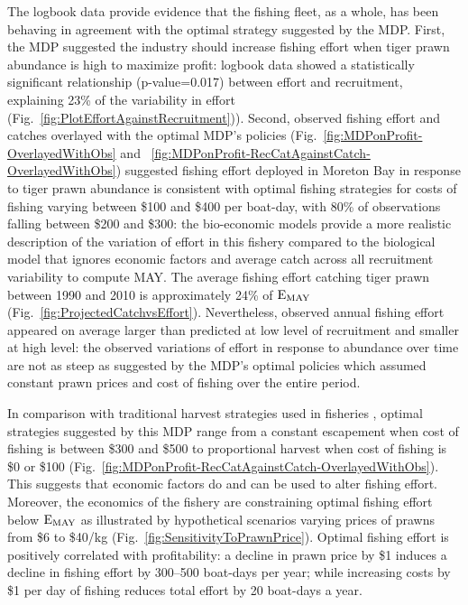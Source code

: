 The logbook data provide evidence that the fishing fleet, as a whole, has been behaving in agreement with the optimal strategy suggested by the MDP. First, the MDP suggested the industry should increase fishing effort when tiger prawn abundance is high to maximize profit: logbook data showed a statistically significant relationship (p-value=0.017) between effort and recruitment, explaining 23\% of the variability in effort (Fig.~\ref{fig:PlotEffortAgainstRecruitment})). Second, observed fishing effort and catches overlayed with the optimal MDP's policies (Fig.~\ref{fig:MDPonProfit-OverlayedWithObs} and ~\ref{fig:MDPonProfit-RecCatAgainstCatch-OverlayedWithObs}) suggested fishing effort deployed in Moreton Bay in response to tiger prawn abundance is consistent with optimal fishing strategies for costs of fishing varying between \$100 and \$400 per boat-day, with 80\% of observations falling between \$200 and \$300: the bio-economic models provide a more realistic description of the variation of effort in this fishery compared to the biological model that ignores economic factors and average catch across all recruitment variability to compute MAY. The average fishing effort catching tiger prawn between 1990 and 2010 is approximately 24\% of ${\rm E_{MAY}}$ (Fig.~\ref{fig:ProjectedCatchvsEffort}). Nevertheless, observed annual fishing effort appeared on average larger than predicted at low level of recruitment and smaller at high level: the observed variations of effort in response to abundance over time are not as steep as suggested by the MDP's optimal policies which assumed constant prawn prices and cost of fishing over the entire period. 

In comparison with traditional harvest strategies used in fisheries \citep{hil92b}, optimal strategies suggested by this MDP range from a constant escapement when cost of fishing is between \$300 and \$500 to proportional harvest when cost of fishing is \$0 or \$100 (Fig.~\ref{fig:MDPonProfit-RecCatAgainstCatch-OverlayedWithObs}). This suggests that economic factors do and can be used to alter fishing effort. Moreover, the economics of the fishery are constraining optimal fishing effort below $\rm{E_{MAY}}$ as illustrated by hypothetical scenarios varying prices of prawns from \$6 to \$40/kg (Fig.~\ref{fig:SensitivityToPrawnPrice}). Optimal fishing effort is positively correlated with profitability: a decline in prawn price by \$1 induces a decline in fishing effort by 300--500 boat-days per year; while increasing costs by \$1 per day of fishing reduces total effort by 20 boat-days a year. \\%

